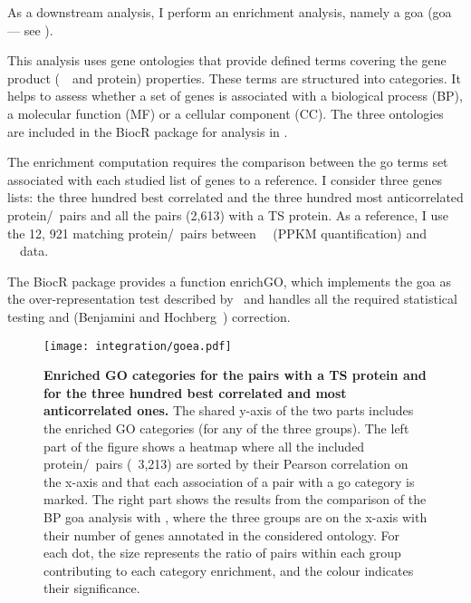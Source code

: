 As a downstream analysis,
I perform an enrichment analysis,
namely a \glsdesc{goa} (\gls{goa} --- see ).

This analysis uses gene ontologies that provide defined terms
covering the gene product (\ie\ \mRNA\ and protein) properties.
These terms are structured into categories.
It helps to assess whether a set of genes is associated with
a biological process (BP), a molecular function (MF) or a cellular component (CC).
The three ontologies are included
in the \gls{BiocR} package 
for analysis in .

The enrichment computation requires
the comparison between the \gls{go} terms set associated
with each studied list of genes to a reference.
I consider three genes lists:
the three hundred best correlated and
the three hundred most anticorrelated protein/\mRNA\ pairs
and all the pairs (2,613) with a \gls{TS} protein.
As a reference, I use the 12, 921 matching protein/\mRNA\ pairs
between \pandey\ \etal\ (\gls{PPKM} quantification) and \uhlen\ \etal\ data.

The \gls{BiocR} package 
provides a function \textsf{enrichGO},
which implements the \gls{goa} as the over-representation test
described by~\citet{Boyle2004-dh}
and handles all the required statistical testing
and (Benjamini and Hochberg~) correction.

    \begin{sidewaysfigure}
        \texttt{[image: integration/goea.pdf]}\centering
        \vspace{-3mm}
        \caption[Enriched GO categories for the pairs with a TS proteins and for the
        three hundred best correlated and most anticorrelated
        ones]{\label{fig:goares}%
        \textbf{Enriched GO categories for the pairs with a TS protein
        and for the three hundred best correlated
        and most anticorrelated ones.}
        The shared y-axis of the two parts includes the enriched GO categories
        (for any of the three groups).
        The left part of the figure shows
        a heatmap where all the included protein/\mRNA\ pairs (\ie\ 3,213)
        are sorted by their Pearson correlation on the x-axis and
        that each association of a pair with a \gls{go} category is marked.
        The right part shows the results from the comparison
        of the BP \gls{goa} analysis with ,
        where the three groups are on the x-axis with their number of genes
        annotated in the considered ontology.
        For each dot, the size represents the ratio of pairs within each group
        contributing to each category enrichment,
        and the colour indicates their significance.
        }
    \end{sidewaysfigure}



